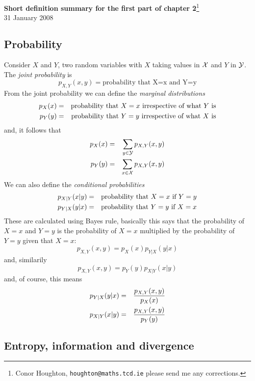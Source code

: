 \documentclass[12pt]{article}
\begin{document}
\begin{center}{\Large
{\bf Short definition summary for the first part of chapter 2}\footnote{Conor Houghton, {\tt houghton@maths.tcd.ie} please
send me any corrections.}}\\[1cm] 31 January 2008\\[1cm]
\end{center}

\subsection*{Probability}
Consider $X$ and $Y$, two random variables with $X$ taking values in ${\cal X}$ and $Y$ in ${\cal
  Y}$. The {\sl joint probability} is
\begin{equation}
p_{X,Y}(x,y)=\mbox{probability that X=x and Y=y}
\end{equation}
From the joint probability we can define the {\sl marginal distributions}
\begin{eqnarray}
p_{X}(x)&=&\mbox{probability that $X=x$ irrespective of what $Y$ is}\cr
p_{Y}(y)&=&\mbox{probability that $Y=y$ irrespective of what $X$ is}
\end{eqnarray}
and, it follows that
\begin{eqnarray}
p_{X}(x)&=&\sum_{y\in{\cal Y}}p_{X,Y}(x,y)\cr
p_{Y}(y)&=&\sum_{x\in{\cal X}}p_{X,Y}(x,y)
\end{eqnarray}
We can also define the {\sl conditional probabilities}
\begin{eqnarray}
p_{X|Y}(x|y)&=&\mbox{probability that $X=x$ if $Y=y$}\cr
p_{Y|X}(y|x)&=&\mbox{probability that $Y=y$ if $X=x$}
\end{eqnarray}
These are calculated using Bayes rule, basically this says that the probability of $X=x$ and $Y=y$ is the probability of $X=x$ multiplied by the probability of $Y=y$ given that $X=x$:
\begin{equation}
p_{X,Y}(x,y)=p_X(x)p_{Y|X}(y|x)
\end{equation}
and, similarily
\begin{equation}
p_{X,Y}(x,y)=p_Y(y)p_{X|Y}(x|y)
\end{equation}
and, of course, this means
\begin{eqnarray}
p_{Y|X}(y|x)&=&\frac{p_{X,Y}(x,y)}{p_X(x)}\cr
p_{X|Y}(x|y)&=&\frac{p_{X,Y}(x,y)}{p_Y(y)}
\end{eqnarray}

\subsection*{Entropy, information and divergence}
\end{document}
